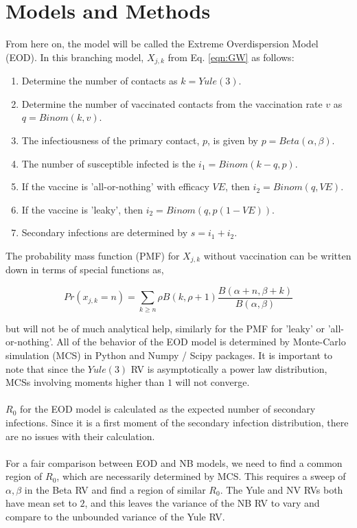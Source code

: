 \documentclass[11pt, twocolumn]{article}
\begin{document}
\section*{Models and Methods}
From here on, the model will be called the Extreme Overdispersion Model (EOD). In this branching model, $X_{j, k}$ from Eq. \ref{eqn:GW} as follows:
\begin{enumerate}
	\item Determine the number of contacts as $k = Yule(3)$.
	\item Determine the number of vaccinated contacts from the vaccination rate $v$ as $q = Binom(k, v)$.
	\item The infectiousness of the primary contact, $p$, is given by $p = Beta(\alpha, \beta)$.
	\item The number of susceptible infected is the $i_1 = Binom(k-q, p)$.
	\item If the vaccine is 'all-or-nothing' with efficacy $VE$, then $i_2 = Binom(q, VE)$.
	\item If the vaccine is 'leaky', then $i_2 = Binom(q, p(1-VE))$.
	\item Secondary infections are determined by $s=i_1+i_2$.
\end{enumerate}
The probability mass function (PMF) for $X_{j, k}$ without vaccination can be written down in terms of special functions as,

\begin{equation*}
	Pr(x_{j, k}=n)=\sum_{k\geq n}\rho B(k, \rho+1)\frac{B(\alpha+n, \beta+k)}{B(\alpha, \beta)}
\end{equation*}

 but will not be of much analytical help, similarly for the PMF for 'leaky' or 'all-or-nothing'. All of the behavior of the EOD model is determined by Monte-Carlo simulation (MCS) in Python and Numpy / Scipy packages. It is important to note that since the $Yule(3)$ RV is asymptotically a power law distribution, MCSs involving moments higher than $1$ will not converge. \\ \\
$R_0$ for the EOD model is calculated as the expected number of secondary infections. Since it is a first moment of the secondary infection distribution, there are no issues with their calculation. \\ \\
For a fair comparison between EOD and NB models, we need to find a common region of $R_0$, which are necessarily determined by MCS. This requires a sweep of $\alpha, \beta$ in the Beta RV and find a region of similar $R_0$. The Yule and NV RVs both have mean set to $2$, and this leaves the variance of the NB RV to vary and compare to the unbounded variance of the Yule RV.\\ \\
\end{document}
